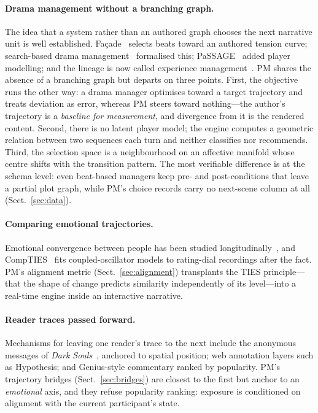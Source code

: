 \documentclass[runningheads]{llncs}
\newcommand{\sysshort}{PM}
\begin{document}
\paragraph{Drama management without a branching graph.}
The idea that a system rather than an authored graph chooses the next narrative unit is well established. Fa\c{c}ade~\cite{mateas2005} selects beats toward an authored tension curve; search-based drama management~\cite{weyhrauch1997} formalised this; PaSSAGE~\cite{thue2007} added player modelling; and the lineage is now called experience management~\cite{riedl2013}. \sysshort{} shares the absence of a branching graph but departs on three points. First, the objective runs the other way: a drama manager optimises toward a target trajectory and treats deviation as error, whereas \sysshort{} steers toward nothing---the author's trajectory is a \emph{baseline for measurement}, and divergence from it is the rendered content. Second, there is no latent player model; the engine computes a geometric relation between two sequences each turn and neither classifies nor recommends. Third, the selection space is a neighbourhood on an affective manifold whose centre shifts with the transition pattern. The most verifiable difference is at the schema level: even beat-based managers keep pre- and post-conditions that leave a partial plot graph, while \sysshort's choice records carry no next-scene column at all (Sect.~\ref{sec:data}).

\paragraph{Comparing emotional trajectories.}
Emotional convergence between people has been studied longitudinally~\cite{anderson2003}, and CompTIES~\cite{butlercomp2017} fits coupled-oscillator models to rating-dial recordings after the fact. \sysshort's alignment metric (Sect.~\ref{sec:alignment}) transplants the TIES principle---that the shape of change predicts similarity independently of its level---into a real-time engine inside an interactive narrative.

\paragraph{Reader traces passed forward.}
Mechanisms for leaving one reader's trace to the next include the anonymous messages of \emph{Dark Souls}~\cite{fromsoftware2011}, anchored to spatial position; web annotation layers such as Hypothesis; and Genius-style commentary ranked by popularity. \sysshort's trajectory bridges (Sect.~\ref{sec:bridges}) are closest to the first but anchor to an \emph{emotional} axis, and they refuse popularity ranking: exposure is conditioned on alignment with the current participant's state.
\end{document}
